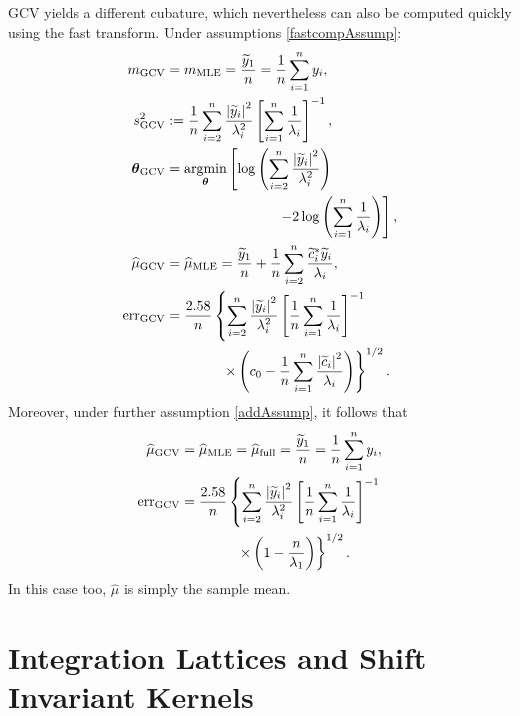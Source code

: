 \documentclass[twocolumn]{svjour3}          %
\newcommand{\bm}[1]{\boldsymbol{#1}}
\newcommand{\vtheta}{{\bm{\theta}}}
\newcommand{\hmu}{\widehat{\mu}}
\newcommand{\MLE}{\textup{MLE}}
\newcommand{\GCV}{\textup{GCV}}
\newcommand{\err}{\textup{err}}
\def\abs#1{\ensuremath{\left \lvert #1 \right \rvert}}
\providecommand{\argmin}{\operatorname*{argmin}}
\begin{document}
GCV yields a different cubature, which nevertheless can also be computed quickly using the fast transform.  Under assumptions \eqref{fastcompAssump}:
\begin{align}
\nonumber
m_{\textup{GCV}} & = m_\MLE =  \frac{\widetilde{y}_1}{n} = \frac 1n \sum_{i=1}^n y_i,\\
\nonumber 
s^2_{\textup{GCV}} & : =  \frac 1{n} \sum_{i=2}^n \frac{\abs{\widetilde{y}_i}^2}{\lambda_i^2}  \left [ \sum_{i=1}^n \frac{1}{\lambda_i} \right]^{-1}, \\
\nonumber 
\vtheta_{\GCV} 
&= \argmin_\vtheta \left[ \log \left ( \sum_{i=2}^n \frac{\abs{\widetilde{y}_i}^2}{\lambda_i^2} 
\right) \right .\\
\label{thetaGCV}
& \qquad \qquad \qquad \qquad  \left . -2\log\left( \sum_{i=1}^n \frac{1}{\lambda_i} \right)
\right], \\
\nonumber
\hmu_{\GCV}
&= \hmu_\MLE  = \frac{\widetilde{y}_1}{n} +
\frac 1n \sum_{i=2}^n \frac{ \widetilde{c}_i^* \widetilde{y}_i}{\lambda_i}, \\
\nonumber
\err_{\textup{GCV}} & =
\frac{2.58}{n}\left\{\sum_{i=2}^n \frac{\abs{\widetilde{y}_i}^2}{\lambda_i^2}  \left [ \frac 1n \sum_{i=1}^n \frac{1}{\lambda_i} \right]^{-1} \right.
\\ 
\nonumber
&\qquad \qquad \left . \times
\left( c_0 - \frac 1n \sum_{i=1}^n \frac{\abs{\widetilde{c}_i}^2}{\lambda_i} \right) 
\right\}^{1/2}.
\end{align}
Moreover, under further assumption \eqref{addAssump}, it follows that 
\begin{align}
\label{muhatGCV-FB-MLE-Simple}
\hmu_{\textup{GCV}}
&= \hmu_\MLE = \hmu_{\textup{full}} =
\frac{\widetilde{y}_1}{n} = \frac 1n \sum_{i=1}^n y_i,\\
\nonumber
\err_{\textup{GCV}} & =
\frac{2.58}{n}\left\{\sum_{i=2}^n \frac{\abs{\widetilde{y}_i}^2}{\lambda_i^2}  \left [ \frac 1n \sum_{i=1}^n \frac{1}{\lambda_i} \right]^{-1} \right.
\\ 
&\qquad \qquad \left . \times
\left( 1 -  \frac{n}{\lambda_1} \right)  
\right\}^{1/2}. \label{errGCVSimple}
\end{align}
In this case too, $\hmu$ is simply the sample mean.



\section{Integration Lattices and Shift Invariant Kernels}
\label{sec:shift_invariant_kernel}
\end{document}
